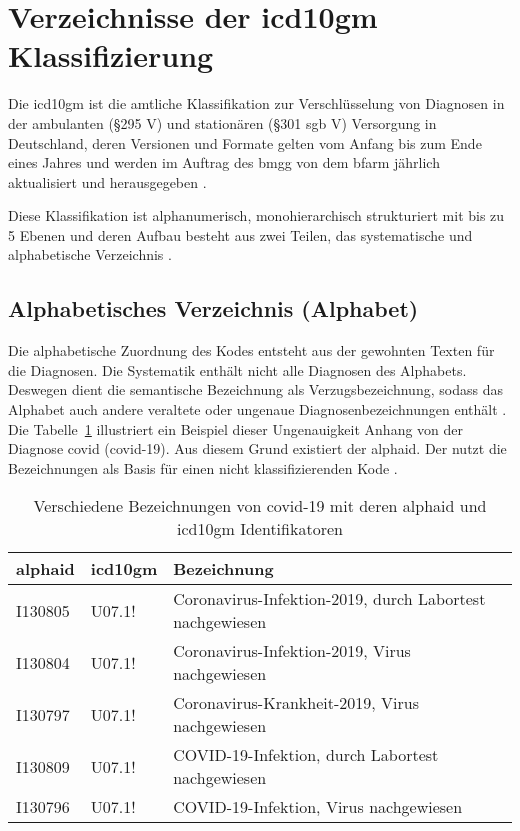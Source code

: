\section{Verzeichnisse der \acs{icd10gm} Klassifizierung} \label{sec:difclass}

Die \ac{icd10gm} ist die amtliche Klassifikation zur Verschlüsselung von Diagnosen in der ambulanten (\S 295  V) und stationären (\S 301 \ac{sgb} V) Versorgung in Deutschland, deren Versionen und Formate gelten vom Anfang bis zum Ende eines Jahres und werden im Auftrag des \ac{bmgg} von dem \ac{bfarm} jährlich aktualisiert und herausgegeben \cite{icd10}. 

Diese Klassifikation ist alphanumerisch, monohierarchisch strukturiert mit bis zu 5 Ebenen und deren Aufbau besteht aus zwei Teilen, das systematische und alphabetische Verzeichnis \cite{icd10}.

\subsection{Alphabetisches Verzeichnis (Alphabet)} \label{subsec:alphabetic}

Die alphabetische Zuordnung des Kodes entsteht aus der gewohnten Texten für die Diagnosen. Die Systematik enthält nicht alle Diagnosen des Alphabets. Deswegen dient die semantische Bezeichnung als Verzugsbezeichnung, sodass das Alphabet auch andere veraltete oder ungenaue Diagnosenbezeichnungen enthält \cite{icd10alpha}. Die Tabelle~\ref{tab:difbe} illustriert ein Beispiel dieser Ungenauigkeit Anhang von der Diagnose \acl{covid} (\acs{covid}-19). Aus diesem Grund existiert der \ac{alphaid}. Der nutzt die Bezeichnungen als Basis für einen nicht klassifizierenden Kode \cite{icd10alpha}.

\begin{table}[ht]
	\centering
	\small
	\caption[Verschiedene Bezeichnungen von COVID-19]{Verschiedene Bezeichnungen von \ac{covid}-19 mit deren \ac{alphaid} und \ac{icd10gm} Identifikatoren}
	\label{tab:difbe}
	\begin{tabular}{|l|l|l|}
		\hline
		\rowcolor{lightgray} \ac{alphaid} & \ac{icd10gm} & Bezeichnung \\
		\hline
		I130805 & U07.1! & Coronavirus-Infektion-2019, durch Labortest nachgewiesen \\ \hline
		I130804 & U07.1! & Coronavirus-Infektion-2019, Virus nachgewiesen \\ \hline
		I130797 & U07.1! & Coronavirus-Krankheit-2019, Virus nachgewiesen \\ \hline
		I130809 & U07.1! & COVID-19-Infektion, durch Labortest nachgewiesen \\ \hline
		I130796 & U07.1! & COVID-19-Infektion, Virus nachgewiesen \\ \hline				
	\end{tabular}
\end{table}

